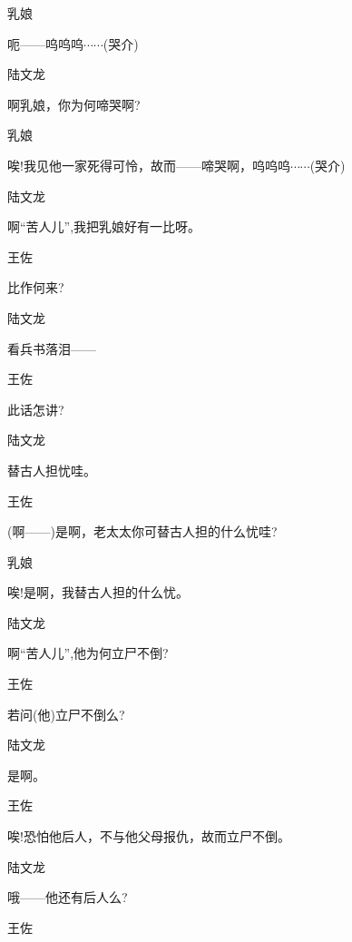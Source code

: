 {{{乳娘\hspace{30pt}~

呃------呜呜呜$\cdots{}\cdots{}$(哭介)}

{陆文龙\hspace{20pt}~

啊乳娘，你为何啼哭啊?}

{乳娘

唉!我见他一家死得可怜，故而------啼哭啊，呜呜呜$\cdots{}\cdots{}$(哭介)}

{陆文龙\hspace{20pt}~

啊``苦人儿'',我把乳娘好有一比呀。}

{王佐\hspace{30pt}~

比作何来?}

{陆文龙\hspace{20pt}~

看兵书落泪------}

{王佐\hspace{30pt}~

此话怎讲?}

{陆文龙\hspace{20pt}~

替古人担忧哇。}

{王佐\hspace{30pt}~

(啊------)是啊，老太太你可替古人担的什么忧哇?}

{乳娘\hspace{30pt}~

唉!是啊，我替古人担的什么忧。}

{陆文龙\hspace{20pt}~

啊``苦人儿'',他为何立尸不倒?}

{王佐\hspace{30pt}~

若问(他)立尸不倒么?}

{陆文龙\hspace{20pt}~

是啊。}

{王佐\hspace{30pt}~

唉!恐怕他后人，不与他父母报仇，故而立尸不倒。}

{陆文龙\hspace{20pt}~

哦------他还有后人么?}

{王佐\hspace{30pt}~

}}}
